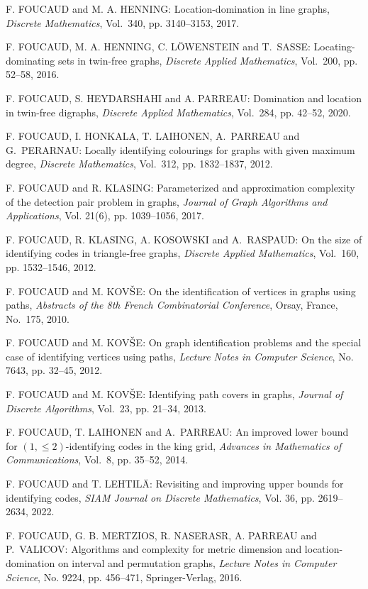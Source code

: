 \begin{thebibliography}{999}
F. FOUCAUD and M. A. HENNING: Location-domination in line graphs, {\it Discrete Mathematics}, Vol.~340, pp. 3140--3153, 2017.
 
 F. FOUCAUD, M. A. HENNING, C. L\"{O}WENSTEIN and T.~SASSE: Locating-dominating sets in twin-free graphs, {\it Discrete Applied Mathematics}, Vol.~200, pp. 52--58, 2016.

F. FOUCAUD, S. HEYDARSHAHI and A. PARREAU: Domination and location in twin-free digraphs, {\it Discrete Applied Mathematics}, Vol.~284, pp. 42--52, 2020.

F. FOUCAUD, I. HONKALA, T. LAIHONEN, A.~PARREAU and G.~PERARNAU: Locally identifying colourings for graphs with given maximum degree, {\it Discrete Mathematics}, Vol.~312, pp. 1832--1837, 2012.

F. FOUCAUD and R. KLASING: Parameterized and approximation complexity of the detection pair problem in graphs, {\it Journal of Graph Algorithms and Applications}, Vol. 21(6), pp. 1039--1056, 2017.

F. FOUCAUD, R. KLASING, A. KOSOWSKI and A.~RASPAUD: On the size of identifying codes in triangle-free graphs, {\it Discrete Applied Mathematics}, Vol.~160, pp. 1532--1546, 2012.

F. FOUCAUD and M. KOV$\check{\rm S}$E: On the identification of vertices in graphs using paths, {\it Abstracts of the 8th French Combinatorial Conference}, Orsay, France, No.~175, 2010.

F. FOUCAUD and M. KOV$\check{\rm S}$E: On graph identification problems and the special case of identifying vertices using paths, {\it Lecture Notes in Computer Science}, No. 7643, pp. 32--45, 2012.

F. FOUCAUD and M. KOV$\check{\rm S}$E: Identifying path covers in graphs, {\it Journal of Discrete Algorithms}, Vol.~23, pp. 21--34, 2013.

F. FOUCAUD, T. LAIHONEN and A.~PARREAU: An improved lower bound for $(1, \leq 2)$-identifying codes in the king grid, {\it Advances in Mathematics of Communications}, Vol.~8, pp. 35--52, 2014.

F. FOUCAUD and T. LEHTIL\"A: Revisiting and improving upper bounds for identifying codes, {\it SIAM Journal on Discrete Mathematics}, Vol. 36, pp. 2619--2634, 2022.

F. FOUCAUD, G. B. MERTZIOS, R. NASERASR, A. PARREAU and P.~VALICOV: Algorithms and complexity for metric dimension and location-domination on interval and permutation graphs, {\it Lecture Notes in Computer Science}, No. 9224, pp. 456--471, Springer-Verlag, 2016.


\end{thebibliography}
